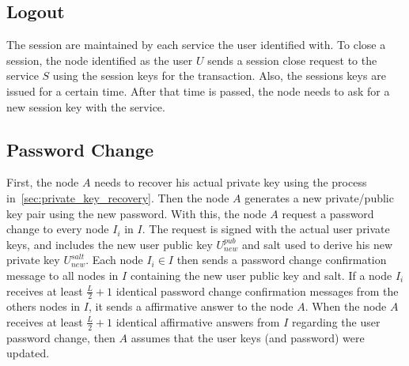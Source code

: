 \subsection{Logout}
The session are maintained by each service the user identified with. To close a
session, the node identified as the user $U$ sends a session close request to
the service $S$ using the session keys for the transaction. Also, the sessions
keys are issued for a certain time. After that time is passed, the node needs
to ask for a new session key with the service.


\subsection{Password Change}

First, the node $A$ needs to recover his actual private key using the process
in~\ref{sec:private_key_recovery}. Then the node $A$ generates a new private/public
key pair using the new password.  With this, the node $A$ request a
password change to every node $I_i$ in $I$. The request is signed with the
actual user private keys, and includes the new user public key $U^{pub}_{new}$
and salt used to derive his new private key $U^{salt}_{new}$. 
Each node $I_i \in I$ then sends a password change confirmation message to all nodes
in $I$ containing the new user public key and salt. If a node $I_i$ receives at
least $\frac{L}{2} + 1$ identical password change confirmation messages from
the others nodes in $I$, it sends a affirmative answer to the node $A$.
 When the node $A$ receives at least $\frac{L}{2} + 1$ identical affirmative
answers from $I$ regarding the user password change, then $A$ assumes that the
user keys (and password) were updated.

